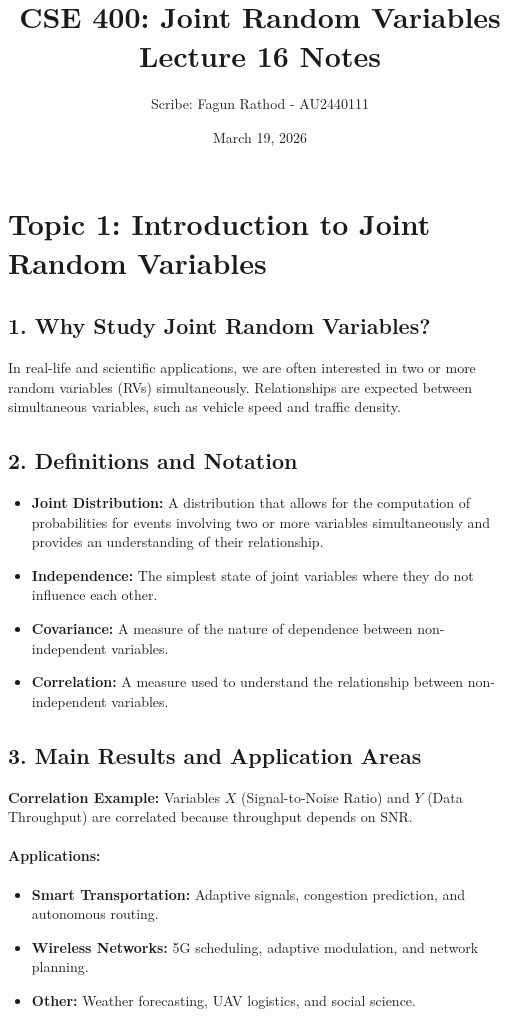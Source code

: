 \documentclass[12pt]{article}
\title{CSE 400: Joint Random Variables \\ \large Lecture 16 Notes}
\author{Scribe: Fagun Rathod - AU2440111}
\date{March 19, 2026}
\begin{document}
\maketitle

\section*{Topic 1: Introduction to Joint Random Variables}

\subsection*{1. Why Study Joint Random Variables?}
In real-life and scientific applications, we are often interested in two or more random variables (RVs) simultaneously. Relationships are expected between simultaneous variables, such as vehicle speed and traffic density.

\subsection*{2. Definitions and Notation}
\begin{itemize}
    \item \textbf{Joint Distribution:} A distribution that allows for the computation of probabilities for events involving two or more variables simultaneously and provides an understanding of their relationship.
    \item \textbf{Independence:} The simplest state of joint variables where they do not influence each other.
    \item \textbf{Covariance:} A measure of the nature of dependence between non-independent variables.
    \item \textbf{Correlation:} A measure used to understand the relationship between non-independent variables.
\end{itemize}

\subsection*{3. Main Results and Application Areas}
\textbf{Correlation Example:} Variables $X$ (Signal-to-Noise Ratio) and $Y$ (Data Throughput) are correlated because throughput depends on SNR.
\paragraph{Applications:}
\begin{itemize}
    \item \textbf{Smart Transportation:} Adaptive signals, congestion prediction, and autonomous routing.
    \item \textbf{Wireless Networks:} 5G scheduling, adaptive modulation, and network planning.
    \item \textbf{Other:} Weather forecasting, UAV logistics, and social science.
\end{itemize}
\end{document}

